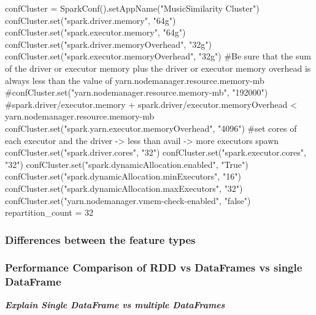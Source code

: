 \begin{pythonCode}[frame=single,label={lst:clust},caption={cluster setup},captionpos=b]
confCluster = SparkConf().setAppName("MusicSimilarity Cluster")
confCluster.set("spark.driver.memory", "64g")
confCluster.set("spark.executor.memory", "64g")
confCluster.set("spark.driver.memoryOverhead", "32g")
confCluster.set("spark.executor.memoryOverhead", "32g")
#Be sure that the sum of the driver or executor memory plus the driver or executor memory overhead is always less than the value of yarn.nodemanager.resource.memory-mb
#confCluster.set("yarn.nodemanager.resource.memory-mb", "192000")
#spark.driver/executor.memory + spark.driver/executor.memoryOverhead < yarn.nodemanager.resource.memory-mb
confCluster.set("spark.yarn.executor.memoryOverhead", "4096")
#set cores of each executor and the driver -> less than avail -> more executors spawn
confCluster.set("spark.driver.cores", "32")
confCluster.set("spark.executor.cores", "32")
confCluster.set("spark.dynamicAllocation.enabled", "True")
confCluster.set("spark.dynamicAllocation.minExecutors", "16")
confCluster.set("spark.dynamicAllocation.maxExecutors", "32")
confCluster.set("yarn.nodemanager.vmem-check-enabled", "false")
repartition_count = 32
\end{pythonCode}

\subsubsection{Differences between the feature types}


\subsubsection{Performance Comparison of RDD vs DataFrames vs single DataFrame}

\noindent\textbf{\textit{Explain Single DataFrame vs multiple DataFrames}}

